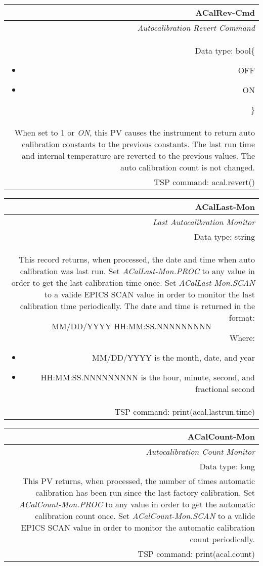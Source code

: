 \documentclass[openany]{article}
\begin{document}
		\begin{tabular}{N}
			\hline
			\bfseries ACalRev-Cmd\label{pv:acalrev-cmd} \\ \hline
			\emph{Autocalibration Revert Command} \\
			Data type: bool\{\begin{itemize}[noitemsep]
				\small
				\item[] OFF
				\item[] ON
			\end{itemize}\} \\
			When set to 1 or \emph{ON}, this PV causes the instrument to return auto calibration constants to the previous constants. The last run time and internal temperature are reverted to the previous values. The auto calibration
count is not changed. \\
			TSP command: acal.revert()
		\end{tabular}

		\begin{tabular}{N}
			\hline
			\bfseries ACalLast-Mon\label{pv:acallast-mon} \\ \hline
			\emph{Last Autocalibration Monitor} \\
			Data type: string \\
			This record returns, when processed, the date and time when auto calibration was last run. Set \emph{ACalLast-Mon.PROC} to any value in order to get the last calibration time once. Set \emph{ACalLast-Mon.SCAN} to a valide EPICS SCAN value in order to monitor the last calibration time periodically. The date and time is returned in the format: $$ \text{MM/DD/YYYY HH:MM:SS.NNNNNNNNN} $$ Where: \begin{itemize} \item MM/DD/YYYY is the month, date, and year \item HH:MM:SS.NNNNNNNNN is the hour, minute, second, and fractional second \end{itemize} \\
			TSP command: print(acal.lastrun.time)
		\end{tabular}

		\begin{tabular}{N}
			\hline
			\bfseries ACalCount-Mon\label{pv:acalcount-mon} \\ \hline
			\emph{Autocalibration Count Monitor} \\
			Data type: long \\
			This PV returns, when processed, the number of times automatic calibration has been run since the last factory calibration. Set \emph{ACalCount-Mon.PROC} to any value in order to get the automatic calibration count once. Set \emph{ACalCount-Mon.SCAN} to a valide EPICS SCAN value in order to monitor the automatic calibration count periodically. \\
			TSP command: print(acal.count)
		\end{tabular}
\end{document}
